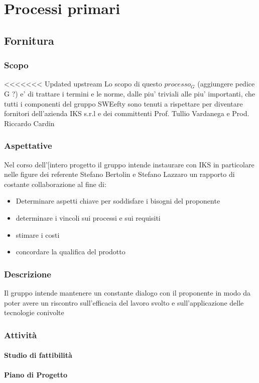 \section{Processi primari}

\subsection{Fornitura}
	
	\subsubsection{Scopo}
<<<<<<< Updated upstream
		Lo scopo di questo $processo_G$ (aggiungere pedice  G ?) e' di trattare i termini e le norme, dalle piu' triviali alle piu' importanti, che tutti i componenti del gruppo SWEefty sono tenuti a rispettare per diventare fornitori dell'azienda IKS s.r.l e dei committenti Prof. Tullio Vardanega e Prod. Riccardo Cardin
	\subsubsection{Aspettative}
	Nel corso dell'[intero progetto il gruppo intende instaurare con IKS in particolare nelle figure dei referente Stefano Bertolin e Stefano Lazzaro un rapporto di costante collaborazione al fine di:
	\begin{itemize}
	\item Determinare aspetti chiave per soddisfare i bisogni del proponente
	\item determinare i vincoli sui processi e sui requisiti
	\item stimare i costi 
	\item concordare la qualifica del prodotto
	\end{itemize}
	\subsubsection{Descrizione}
	Il gruppo intende mantenere un constante dialogo con il proponente in modo da poter avere un riscontro sull'efficacia del lavoro svolto e sull'applicazione delle tecnologie conivolte
	\subsubsection{Attività}
		\paragraph{Studio di fattibilità}
		\paragraph{Piano di Progetto}
